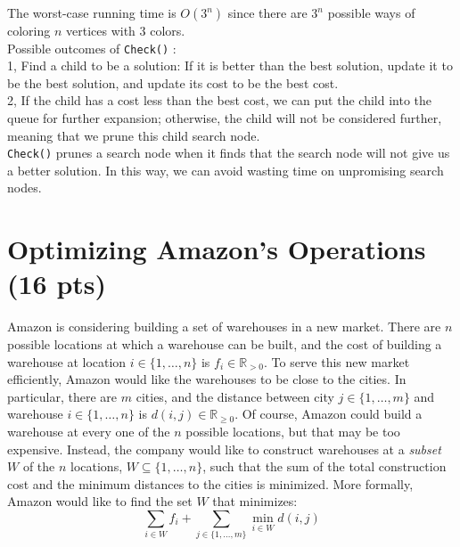 \documentclass{article}
\begin{document}
\begin{itemize}
\begin{tcolorbox}
 The worst-case running time is $O(3^n)$ since there are $3^n$ possible ways of coloring $n$ vertices with $3$ colors.\\
 
Possible outcomes of \texttt{Check()} :\\

 1, Find a child to be a solution: If it is better than the best solution, update it to be the best solution, and update its cost to be the best cost. \\
 
 2, If the child has a cost less than the best cost, we can put the child into the queue for further expansion; otherwise, the child will not be considered further, meaning that we prune this child search node. \\
 
 \texttt{Check()} prunes a search node when it finds that the search node will not give us a better solution. In this way, we can avoid wasting time on unpromising search nodes. 
 
 
\end{tcolorbox} 

\end{itemize}

\section{Optimizing Amazon's Operations (16 pts)}

Amazon is considering building a set of warehouses in a new market. There are $n$ possible locations at which a warehouse can be built, and the cost of building a warehouse at location $i\in\{1,\dots,n\}$ is $f_i\in\mathbb{R}_{>0}$. To serve this new market efficiently, Amazon would like the warehouses to be close to the cities. In particular, there are $m$ cities, and the distance between city $j\in\{1,\dots,m\}$ and warehouse $i\in\{1,\dots,n\}$ is $d(i,j)\in\mathbb{R}_{\geq 0}$. Of course, Amazon could build a warehouse at every one of the $n$ possible locations, but that may be too expensive. Instead, the company would like to construct warehouses at a \textit{subset} $W$ of the $n$ locations, $W\subseteq\{1,\dots,n\}$, such that the sum of the total construction cost and the minimum distances to the cities is minimized. More formally, Amazon would like to find the set $W$ that minimizes:
$$\sum_{i\in W}{f_i} + \sum_{j\in\{1,\dots,m\}}{\min_{i\in W}{d(i,j)}}$$
\end{document}
